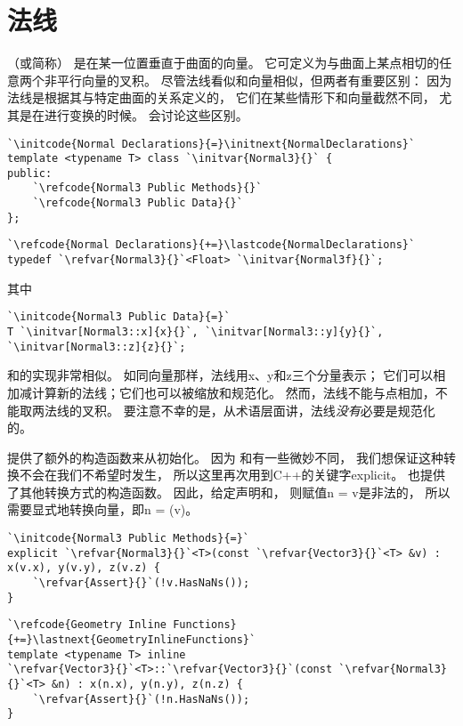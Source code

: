 \section{法线}\label{sec:法线}

（或简称）
是在某一位置垂直于曲面的向量。
它可定义为与曲面上某点相切的任意两个非平行向量的叉积。
尽管法线看似和向量相似，但两者有重要区别：
因为法线是根据其与特定曲面的关系定义的，
它们在某些情形下和向量截然不同，
尤其是在进行变换的时候。
会讨论这些区别。
\begin{lstlisting}
`\initcode{Normal Declarations}{=}\initnext{NormalDeclarations}`
template <typename T> class `\initvar{Normal3}{}` {
public:
    `\refcode{Normal3 Public Methods}{}`
    `\refcode{Normal3 Public Data}{}`
};
\end{lstlisting}
\begin{lstlisting}
`\refcode{Normal Declarations}{+=}\lastcode{NormalDeclarations}`
typedef `\refvar{Normal3}{}`<Float> `\initvar{Normal3f}{}`;
\end{lstlisting}
其中
\begin{lstlisting}
`\initcode{Normal3 Public Data}{=}`
T `\initvar[Normal3::x]{x}{}`, `\initvar[Normal3::y]{y}{}`, `\initvar[Normal3::z]{z}{}`;
\end{lstlisting}

和的实现非常相似。
如同向量那样，法线用{\ttfamily x}、{\ttfamily y}和{\ttfamily z}三个分量表示；
它们可以相加减计算新的法线；它们也可以被缩放和规范化。
然而，法线不能与点相加，不能取两法线的叉积。
要注意不幸的是，从术语层面讲，法线\emph{没有}必要是规范化的。

提供了额外的构造函数来从初始化。
因为
和有一些微妙不同，
我们想保证这种转换不会在我们不希望时发生，
所以这里再次用到C++的关键字{\ttfamily explicit}。
也提供了其他转换方式的构造函数。
因此，给定声明和，
则赋值{\ttfamily n = v}是非法的，
所以需要显式地转换向量，即{\ttfamily n = (v)}。
\begin{lstlisting}
`\initcode{Normal3 Public Methods}{=}`
explicit `\refvar{Normal3}{}`<T>(const `\refvar{Vector3}{}`<T> &v) : x(v.x), y(v.y), z(v.z) {
    `\refvar{Assert}{}`(!v.HasNaNs());
}
\end{lstlisting}
\begin{lstlisting}
`\refcode{Geometry Inline Functions}{+=}\lastnext{GeometryInlineFunctions}`
template <typename T> inline
`\refvar{Vector3}{}`<T>::`\refvar{Vector3}{}`(const `\refvar{Normal3}{}`<T> &n) : x(n.x), y(n.y), z(n.z) {
    `\refvar{Assert}{}`(!n.HasNaNs());
}
\end{lstlisting}

